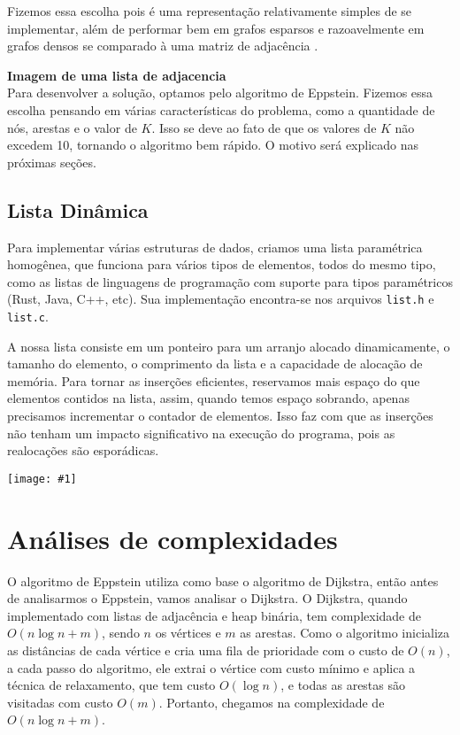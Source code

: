 \documentclass[12pt]{article}
\newcommand\image[1]{\noindent\texttt{[image: \#1]}}
\begin{document}
    Fizemos essa escolha pois é uma representação relativamente simples de se
    implementar, além de performar bem em grafos esparsos e razoavelmente em
    grafos densos se comparado à uma matriz de adjacência \cite{codeforce}.

    \textbf{Imagem de uma lista de adjacencia}
    \\

    Para desenvolver a solução, optamos pelo algoritmo de Eppstein. Fizemos essa
    escolha pensando em várias características do problema, como a quantidade de
    nós, arestas e o valor de $K$. Isso se deve ao fato de que os valores de $K$
    não excedem 10, tornando o algoritmo bem rápido. O motivo será explicado nas
    próximas seções.

    \subsection{Lista Dinâmica}
    Para implementar várias estruturas de dados, criamos uma lista paramétrica
    homogênea, que funciona para vários tipos de elementos, todos do mesmo tipo,
    como as listas de linguagens de programação com suporte para tipos
    paramétricos (Rust, Java, C++, etc). Sua implementação encontra-se nos
    arquivos \texttt{list.h} e \texttt{list.c}.

    A nossa lista consiste em um ponteiro para um arranjo alocado dinamicamente,
    o tamanho do elemento, o comprimento da lista e a capacidade de alocação de
    memória. Para tornar as inserções eficientes, reservamos mais espaço do que
    elementos contidos na lista, assim, quando temos espaço sobrando, apenas
    precisamos incrementar o contador de elementos. Isso faz com que as
    inserções não tenham um impacto significativo na execução do programa, pois
    as realocações são esporádicas.

    \image{lista}

    \newpage

    \printbibliography[title={Fontes}]


    \section{Análises de complexidades}
    O algoritmo de Eppstein utiliza como base o algoritmo de Dijkstra, então antes de analisarmos o Eppstein, vamos analisar o Dijkstra.
    O Dijkstra, quando implementado com listas de adjacência e heap binária, tem complexidade de $O(n\log n + m)$, sendo $n$ os vértices e $m$ as arestas. Como o algoritmo inicializa as distâncias de cada vértice e cria uma fila de prioridade com o custo de $O(n)$, a cada passo do algoritmo, ele extrai o vértice com custo mínimo e aplica a técnica de relaxamento, que tem custo $O(\log n)$, e todas as arestas são visitadas com custo $O(m)$. Portanto, chegamos na complexidade de $O(n\log n + m)$.
    
\end{document}
